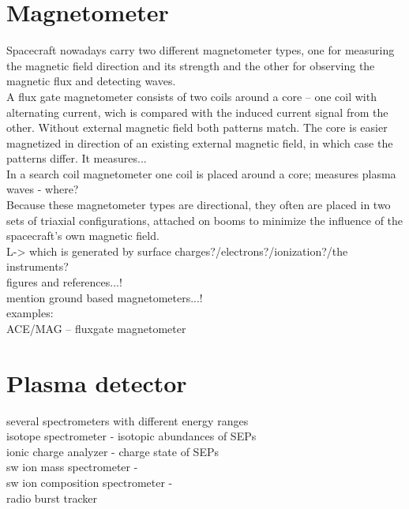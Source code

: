 \section{Magnetometer}

Spacecraft nowadays carry two different magnetometer types, one for measuring the magnetic field direction and its strength and the other for observing the magnetic flux and detecting waves.\\

A flux gate magnetometer consists of two coils around a core -- one coil with alternating current, wich is compared with the induced current signal from the other. Without external magnetic field both patterns match. The core is easier magnetized in direction of an existing external magnetic field, in which case the patterns differ. It measures...\\
In a search coil magnetometer one coil is placed around a core; measures plasma waves - where?\\

Because these magnetometer types are directional, they often are placed in two sets of triaxial configurations, attached on booms to minimize the influence of the spacecraft's own magnetic field.\\
L-> which is generated by surface charges?/electrons?/ionization?/the instruments?\\

figures and references...!\\
mention ground based magnetometers...!\\

examples:\\
ACE/MAG -- fluxgate magnetometer\\


\section{Plasma detector}

several spectrometers with different energy ranges\\

isotope spectrometer - isotopic abundances of SEPs\\
ionic charge analyzer - charge state of SEPs\\
sw ion mass spectrometer - \\
sw ion composition spectrometer - \\
radio burst tracker\\


